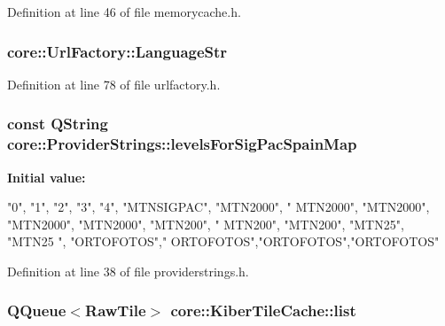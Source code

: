 \-Definition at line 46 of file memorycache.\-h.

\hypertarget{group___o_p_map_widget_ga5d9399e074794da8ad0593e87e554228}{
\subsubsection[{\-Language\-Str}]{ {\bf core\-::\-Url\-Factory\-::\-Language\-Str}}}\label{group___o_p_map_widget_ga5d9399e074794da8ad0593e87e554228}


\-Definition at line 78 of file urlfactory.\-h.

\hypertarget{group___o_p_map_widget_ga8e0c0e07bd5f4a133451306c0603f393}{
\subsubsection[{levels\-For\-Sig\-Pac\-Spain\-Map}]{\setlength{\rightskip}{0pt plus 5cm}const {\bf \-Q\-String} {\bf core\-::\-Provider\-Strings\-::levels\-For\-Sig\-Pac\-Spain\-Map}}}\label{group___o_p_map_widget_ga8e0c0e07bd5f4a133451306c0603f393}
{\bfseries \-Initial value\-:}
\begin{DoxyCode}
 {"0", "1", "2", "3", "4",
                                                                "MTNSIGPAC",
                                                                "MTN2000", "
      MTN2000", "MTN2000", "MTN2000", "MTN2000",
                                                                "MTN200", "
      MTN200", "MTN200",
                                                                "MTN25", "MTN25
      ",
                                                                "ORTOFOTOS","
      ORTOFOTOS","ORTOFOTOS","ORTOFOTOS"}
\end{DoxyCode}


\-Definition at line 38 of file providerstrings.\-h.

\hypertarget{group___o_p_map_widget_ga097b545fed7bd5b8be78160165f4f6f5}{
\subsubsection[{list}]{\setlength{\rightskip}{0pt plus 5cm}\-Q\-Queue$<$\-Raw\-Tile$>$ {\bf core\-::\-Kiber\-Tile\-Cache\-::list}}}\label{group___o_p_map_widget_ga097b545fed7bd5b8be78160165f4f6f5}



